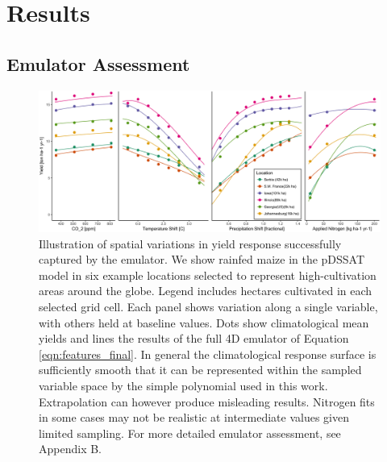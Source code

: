 \documentclass[gmd, manuscript]{copernicus} %
\begin{document}
\section{Results}
\label{S:3}
\subsection{Emulator Assessment}
\label{S:4}

\begin{figure}[ht]
\centering
    \includegraphics[width=16cm]{figures/regression_areas.png}
    \caption{Illustration of spatial variations in yield response successfully captured by the emulator. 
    We show rainfed maize in the pDSSAT model in six example locations selected to represent high-cultivation areas around the globe. 
    Legend includes hectares cultivated in each selected grid cell. 
    Each panel shows variation along a single variable, with others held at baseline values. 
    Dots show climatological mean yields and lines the results of the full 4D emulator of Equation \ref{eqn:features_final}. 
    In general the climatological response surface is sufficiently smooth that it can be represented within the sampled variable space by the simple polynomial used in this work. 
    Extrapolation can however produce misleading results. 
    Nitrogen fits in some cases may not be realistic at intermediate values given limited sampling. 
    For more detailed emulator assessment, see Appendix B.}
   \label{fig:regression}
\end{figure}
\end{document}
